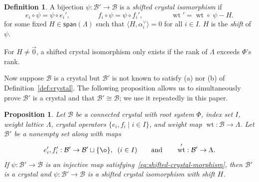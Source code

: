 \documentclass[12pt]{amsart}
\renewcommand{\span}{\mathsf{span}}
\DeclareMathOperator{\wt}{wt}
\newtheorem{proposition}[theorem]{Proposition}
\theoremstyle{definition}
\newtheorem{definition}[theorem]{Definition}
\theoremstyle{remark}
\begin{document}
\begin{definition}
A bijection $\psi:\mathcal{B}'\to\mathcal{B}$ is a \emph{shifted crystal isomorphism} if 
\begin{equation} \label{eq:shifted-crystal-morphism}
e_i\circ\psi = \psi \circ e_i', \qquad\qquad f_i\circ\psi = \psi \circ f_i', \qquad\qquad \wt' = \wt\circ\;\psi - H.
\end{equation}
for some fixed $H\in\span(\Lambda)$ such that $\langle H, \alpha_i^\vee\rangle = 0$ for all $i\in I$. $H$ is the \emph{shift} of $\psi$. 
\end{definition}
For $H\neq \vec 0$, a shifted crystal
isomorphism only exists if the rank of $\Lambda$ exceeds $\Phi$'s rank.

Now suppose ${\mathcal B}$ is a crystal but
${\mathcal B}'$ is not known to satisfy (a) nor (b) of Definition~\ref{def:crystal}. The following proposition allows us to simultaneously prove ${\mathcal{B}}'$ is a crystal and
that $\mathcal{B}'\cong\mathcal{B}$; we use it repeatedly in this paper. 

\begin{proposition} \label{prop:inj-implies-bij}
Let $\mathcal{B}$ be a connected crystal with root system $\Phi$, index set $I$, weight lattice $\Lambda$, crystal operators $\{e_i,f_i \;|\; i\in I\}$, and weight map $\wt:\mathcal{B}\to \Lambda$.
Let $\mathcal{B}'$ be a nonempty set along with maps 
\[
e_i',f_i': \mathcal{B}'\to \mathcal{B}'\sqcup \{\o\},\;\; (i\in I) \qquad \text{and}\qquad 
\wt': \mathcal{B}'\to\Lambda.
\]
If $\psi:\mathcal{B}'\to\mathcal{B}$ is an injective map satisfying~\eqref{eq:shifted-crystal-morphism},
then ${\mathcal B}'$ is a crystal and $\psi:{\mathcal B}'\to {\mathcal B}$ is a shifted crystal 
isomorphism with shift $H$.
\end{proposition}
\end{document}
